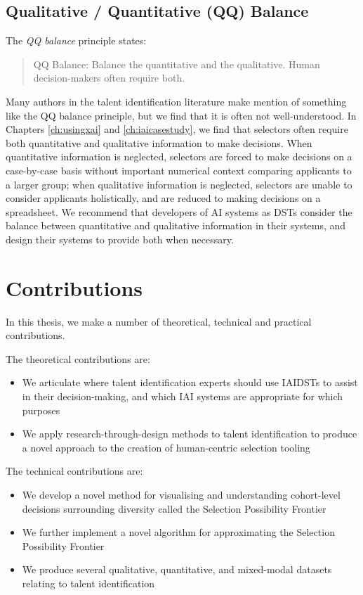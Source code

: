 \subsection{Qualitative / Quantitative (QQ) Balance}
The \emph{QQ balance} principle states:

\begin{quote}
    QQ Balance: Balance the quantitative and the qualitative. Human decision-makers often require both.
\end{quote}

Many authors in the talent identification literature make mention of something like the QQ balance principle, but we find that it is often not well-understood. In Chapters \ref{ch:usingxai} and \ref{ch:iaicasestudy}, we find that selectors often require both quantitative and qualitative information to make decisions. When quantitative information is neglected, selectors are forced to make decisions on a case-by-case basis without important numerical context comparing applicants to a larger group; when qualitative information is neglected, selectors are unable to consider applicants holistically, and are reduced to making decisions on a spreadsheet. We recommend that developers of AI systems as DSTs consider the balance between quantitative and qualitative information in their systems, and design their systems to provide both when necessary.

\section{Contributions}
In this thesis, we make a number of theoretical, technical and practical contributions.

The theoretical contributions are:

\begin{itemize}
    \item We articulate where talent identification experts should use IAIDSTs to assist in their decision-making, and which IAI systems are appropriate for which purposes
    \item We apply research-through-design methods to talent identification to produce a novel approach to the creation of human-centric selection tooling
\end{itemize}

The technical contributions are:

\begin{itemize}
    \item We develop a novel method for visualising and understanding cohort-level decisions surrounding diversity called the Selection Possibility Frontier
    \item We further implement a novel algorithm for approximating the Selection Possibility Frontier
    \item We produce several qualitative, quantitative, and mixed-modal datasets relating to talent identification
\end{itemize}

